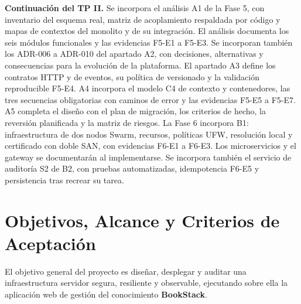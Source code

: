\documentclass[12pt,a4paper]{article}
\begin{document}
\noindent\textbf{Continuación del TP II.} Se incorpora el análisis A1 de la
Fase 5, con inventario del esquema real, matriz de acoplamiento respaldada
por código y mapas de contextos del monolito y de su integración. El análisis documenta
los seis módulos funcionales y las evidencias F5-E1 a F5-E3. Se incorporan
también los ADR-006 a ADR-010 del apartado A2, con decisiones, alternativas
y consecuencias para la evolución de la plataforma. El apartado A3 define
los contratos HTTP y de eventos, su política de versionado y la validación
reproducible F5-E4. A4 incorpora el modelo C4 de contexto y contenedores,
las tres secuencias obligatorias con caminos de error y las evidencias F5-E5 a F5-E7.
A5 completa el diseño con el plan de migración, los criterios de hecho,
la reversión planificada y la matriz de riesgos.
La Fase 6 incorpora B1: infraestructura de dos nodos Swarm, recursos,
políticas UFW, resolución local y certificado con doble SAN, con evidencias
F6-E1 a F6-E3. Los microservicios y el gateway se documentarán al implementarse.
Se incorpora también el servicio de auditoría S2 de B2, con pruebas
automatizadas, idempotencia F6-E5 y persistencia tras recrear su tarea.

\vspace{0.2cm}
\tableofcontents
\newpage

\section{Objetivos, Alcance y Criterios de Aceptación}
El objetivo general del proyecto es diseñar, desplegar y auditar una infraestructura servidor segura, resiliente y observable, ejecutando sobre ella la aplicación web de gestión del conocimiento \textbf{BookStack}.
\end{document}
